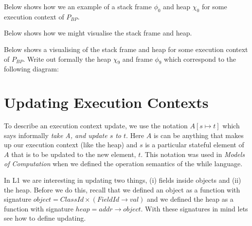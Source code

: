 \frmrule

\begin{example}
Below shows how we an example of a stack frame $\phi_0$ and heap $\chi_0$ 
for some execution context of $P_{BP}$. 


Below shows how we might visualise the stack frame and heap.

\end{example}

\frmrule

\begin{example}
Below shows a visualising of the stack frame and heap for 
some execution context of $P_{BP}$.
Write out formally the heap $\chi_9$ and frame $\phi_9$ 
which correspond to the following diagram:

\end{example}


\frmrule



\section{Updating Execution Contexts}

To describe an execution context update, we use the notation 
$A[s \mapsto t]$ which says informally \textit{take A, and update
$s$ to $t$}. Here $A$ is can be anything that makes up our execution context 
(like the heap) and $s$ is a particular stateful element of $A$ that is to be 
updated to the new element, $t$. This notation was used in 
\textit{Models of Computation} when we defined the operation semantics of the 
while language.

In L1 we are interesting in updating two things, (i) fields inside objects and 
(ii) the heap. Before we do this, recall that we defined an object as a 
function with signature $object = ClassId \times (FieldId \rightarrow val)$ 
and we defined the heap as a function with signature
$heap = addr \rightarrow object$. With these signatures in mind lets see 
how to define updating.

